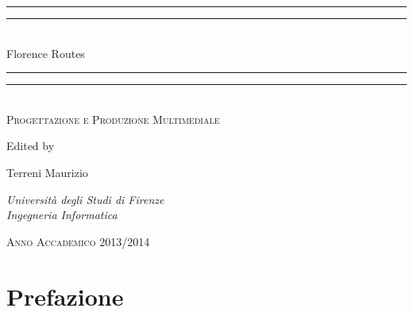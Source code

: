 \newcommand*{\titleGP}{\begingroup %
\centering %
\vspace*{\baselineskip} %

\rule{\textwidth}{1.6pt}\vspace*{-\baselineskip}\vspace*{2pt} %
\rule{\textwidth}{0.4pt}\\[\baselineskip] %

{\LARGE Florence Routes}\\[0.2\baselineskip] %

\rule{\textwidth}{0.4pt}\vspace*{-\baselineskip}\vspace{3.2pt} %
\rule{\textwidth}{1.6pt}\\[\baselineskip] %

\scshape %
Progettazione e Produzione Multimediale
\par %

\vspace*{2\baselineskip} %

Edited by \\[\baselineskip]
{\Large Terreni Maurizio\par} %
{\itshape Università degli Studi di Firenze \\ Ingegneria Informatica\par} %

\vfill %

{\scshape Anno Accademico 2013/2014} \\[0.3\baselineskip] %


\endgroup}


 

\pagestyle{empty} %

\titleGP %


\newpage

\tableofcontents

\chapter*{Prefazione}
 

